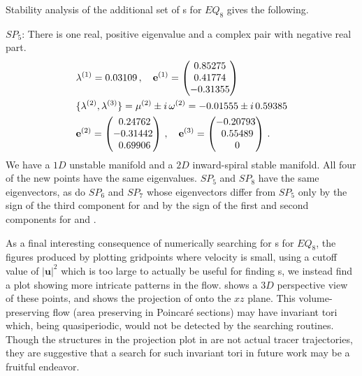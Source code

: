 \documentclass[letter,12pt,openany]{article}
\begin{document}
Stability analysis of the additional set of {\stagp}s for $EQ_8$ gives the
following.

 $SP_5$: There is one real, positive eigenvalue
 and a complex pair with negative real part.
  \begin{align} &\eigExp[1] = 0.03109 \,,\quad \jEigvec[1] =
\begin{pmatrix}
             {0.85275} \cr
             {0.41774} \cr
             {-0.31355} \cr
   \end{pmatrix}
   \\
&\{ \eigExp[2],\eigExp[3]\}
  = \eigRe[2] \pm i \,\eigIm[2] =  -0.01555 \pm i\, 0.59385
   \label{EQSP5eigs}\\
&\jEigvec[2] =
\begin{pmatrix}
             {~0.24762} \cr
             {-0.31442} \cr
             {~0.69906} \cr
   \end{pmatrix}
    \,,\quad
\jEigvec[3] =
\begin{pmatrix}
             {-0.20793} \cr
             {~0.55489} \cr
             {~0} \cr
   \end{pmatrix}
\,.
\end{align}
 We have a $1D$ unstable manifold and a $2D$ inward-spiral
stable manifold. All four of the new points have the same
eigenvalues. $SP_5$ and $SP_8$ have the same eigenvectors, as do $SP_6$
and $SP_7$ whose eigenvectors differ from $SP_5$ only by the sign of
the third component for \jEigvec[1] and by the sign of the first and
second components for \jEigvec[2] and \jEigvec[3].

As a final interesting consequence of numerically searching for \stagp s 
for $EQ_8$, the figures produced by plotting gridpoints where velocity is 
small, using a cutoff value of $|\mathbf{u}|^{2}$ which is too large to 
actually be useful for finding \stagp s, we instead find a plot showing 
more intricate patterns in the flow.  
shows a $3D$ perspective view of these points, and 
 shows the projection of 
 onto the $xz$ plane. This 
volume-preserving flow (area preserving in Poincar\'e sections) may have 
invariant tori which, being quasiperiodic, would not be detected by the 
{\stagp} searching routines. Though the structures in the 
projection plot in  are not actual tracer 
trajectories, they are suggestive that a search for such invariant tori 
in future work may be a fruitful endeavor.  
\end{document}
